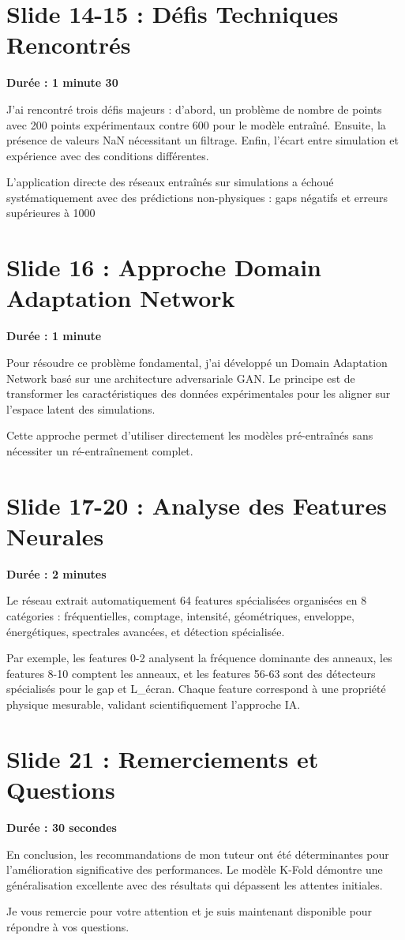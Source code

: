 \documentclass[12pt,a4paper]{article}
\begin{document}
\section{Slide 14-15 : Défis Techniques Rencontrés}
\textbf{Durée : 1 minute 30}

J'ai rencontré trois défis majeurs : d'abord, un problème de nombre de points avec 200 points expérimentaux contre 600 pour le modèle entraîné. Ensuite, la présence de valeurs NaN nécessitant un filtrage. Enfin, l'écart entre simulation et expérience avec des conditions différentes.

L'application directe des réseaux entraînés sur simulations a échoué systématiquement avec des prédictions non-physiques : gaps négatifs et erreurs supérieures à 1000%

\section{Slide 16 : Approche Domain Adaptation Network}
\textbf{Durée : 1 minute}

Pour résoudre ce problème fondamental, j'ai développé un Domain Adaptation Network basé sur une architecture adversariale GAN. Le principe est de transformer les caractéristiques des données expérimentales pour les aligner sur l'espace latent des simulations.

Cette approche permet d'utiliser directement les modèles pré-entraînés sans nécessiter un ré-entraînement complet.

\section{Slide 17-20 : Analyse des Features Neurales}
\textbf{Durée : 2 minutes}

Le réseau extrait automatiquement 64 features spécialisées organisées en 8 catégories : fréquentielles, comptage, intensité, géométriques, enveloppe, énergétiques, spectrales avancées, et détection spécialisée.

Par exemple, les features 0-2 analysent la fréquence dominante des anneaux, les features 8-10 comptent les anneaux, et les features 56-63 sont des détecteurs spécialisés pour le gap et L\_écran. Chaque feature correspond à une propriété physique mesurable, validant scientifiquement l'approche IA.

\section{Slide 21 : Remerciements et Questions}
\textbf{Durée : 30 secondes}

En conclusion, les recommandations de mon tuteur ont été déterminantes pour l'amélioration significative des performances. Le modèle K-Fold démontre une généralisation excellente avec des résultats qui dépassent les attentes initiales.

Je vous remercie pour votre attention et je suis maintenant disponible pour répondre à vos questions.
\end{document}
